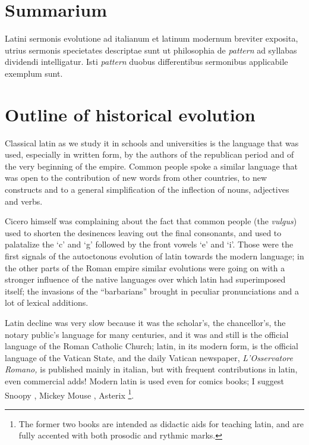 \section*{Summarium}  
Latini sermonis evolutione ad italianum et la\-ti\-num
modernum breviter exposita,  utrius  sermonis  spe\-cie\-ta\-tes  descriptae
sunt  ut  philosophia  de  {\it pattern} ad syllabas dividendi intelligatur.
Isti {\it pattern}  duobus  differentibus  sermonibus  applicabile  exemplum
sunt.

\section{Outline of historical evolution}
Classical  latin  as we study it in schools and universities is the language
that was used, especially in written form, by the authors of the  republican
period  and  of  the  very  beginning  of  the empire. Common people spoke a
similar language that was open to the contribution of new words  from  other
countries,  to  new  constructs  and  to  a  general  simplification  of the
inflection of nouns, adjectives and verbs.

Cicero  himself  was complaining about the fact that common people (the {\it
vulgus\/}) used to shorten the desinences leaving out the final  consonants,
and  used to palatalize the `c' and `g' followed by the front vowels `e' and
`i'. Those were the first signals of  the  autoctonous  evolution  of  latin
towards  the modern language; in the other parts of the Roman empire similar
evolutions were going on with a stronger influence of the  native  languages
over    which    latin   had  superimposed  itself;  the  invasions  of  the
``barbarians'' brought in peculiar  pronunciations  and  a  lot  of  lexical
additions.

Latin  decline was very slow because it was the scholar's, the chancellor's,
the notary public's language for many centuries, and it was and still is the
official  language  of the Roman Catholic Church; latin, in its modern form,
is the official language  of  the  Vatican  State,  and  the  daily  Vatican
newspaper,  {\it  L'Osservatore Romano,} is published mainly in italian, but
with frequent contributions in latin, even commercial adds! Modern latin  is
used  even  for  comics  books; I suggest Snoopy \cite{snoopy}, Mickey Mouse
\cite{MMouse}, Asterix  \cite{asterix}\footnote{The  former  two  books  are
intended  as  didactic  aids for teaching latin, and are fully accented with
both prosodic and rythmic marks.}.

